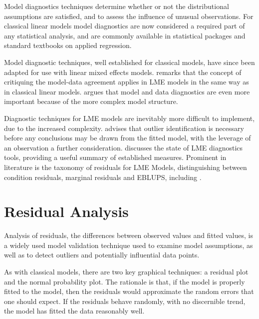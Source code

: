 \documentclass[12pt, a4paper]{report}
\theoremstyle{definition}
\theoremstyle{remark}
\begin{document}

Model diagnostics techniques determine whether or not the distributional assumptions are satisfied, and to assess the influence of unusual observations. For classical linear models model diagnostics are now considered a required part of any statistical analysis, and are commonly available in statistical packages and standard textbooks on applied regression.


Model diagnostic techniques, well established for classical models, have since been adapted for use with linear mixed effects models. \citet{schabenberger} remarks that the concept of critiquing the model-data agreement applies in LME models in the same way as in classical linear models. \citet{west} argues that model and data diagnostics are even more important because of the more complex model structure. 


Diagnostic techniques for LME models are inevitably more difficult to implement, due to the increased complexity. \citet{Christensen} advises that outlier identification is necessary before any conclusions may be drawn from the fitted model, with the leverage of an observation a further consideration. \citet{schabenberger} discusses the state of LME diagnostics tools, providing a useful summary of established measures. Prominent in literature is the taxonomy of residuals for LME Models, distinguishing between condition residuals, marginal residuals and EBLUPS, including \citet{hilden1995, schabenberger, west, NobreSinger2007}. 


\section{Residual Analysis}
Analysis of residuals, the differences between observed values and fitted values, is a widely used model validation technique used to examine model assumptions, as well as to detect outliers and potentially influential data points. 

As with classical models, there are two key graphical techniques: a residual plot and the normal probability plot. The rationale is that, if the model is properly fitted to the model, then the residuals would approximate the random errors that one should expect. If the residuals behave randomly, with no discernible trend, the model has fitted the data reasonably well. 
\end{document}
